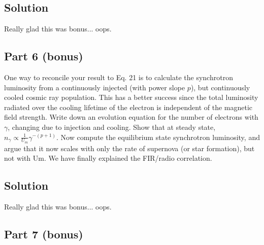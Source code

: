 \documentclass[12pt]{article}
\begin{document}

\subsection*{Solution}

Really glad this was bonus... oops.


\subsection*{Part 6 (bonus)}

One way to reconcile your result to Eq. 21 is to calculate the synchrotron luminosity from a continuously injected (with power slope $p$), but continuously cooled cosmic ray population. This has a better success since the total luminosity radiated over the cooling lifetime of the electron is independent of the magnetic field strength. Write down an evolution equation for the number of electrons with $\gamma$, changing due to injection and cooling. Show that at steady state, $n_\gamma \propto \frac{1}{U_m} \gamma^{-(p+1)}$. Now compute the equilibrium state synchrotron luminosity, and argue that it now scales with only the rate of supernova (or star formation), but not with Um. We have finally explained the FIR/radio correlation.


\subsection*{Solution}

Really glad this was bonus... oops.


\subsection*{Part 7 (bonus)}
\end{document}
